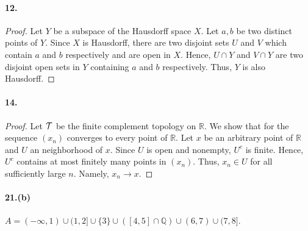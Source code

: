   \paragraph{12.}
  \begin{proof}
    Let $Y$ be a subspace of the Hausdorff space $X$. Let $a,b$ be two distinct
    points of $Y$. Since $X$ is Hausdorff, there are two disjoint sets $U$ and 
    $V$ which contain $a$ and $b$ respectively and are open in $X$. Hence, 
    $U\cap Y$ and $V\cap Y$ are two disjoint open sets in $Y$ containing $a$
    and $b$ respectively. Thus, $Y$ is also Hausdorff.
  \end{proof}
  
  \paragraph{14.}
  \begin{proof}
    Let $\mathcal{T}$ be the finite complement topology on $\mathbb{R}$. We show
    that for the sequence $(x_n)$ converges to every point of $\mathbb{R}$.
    Let $x$ be an arbitrary point of $\mathbb{R}$ and $U$ an neighborhood of 
    $x$. Since $U$ is open and nonempty, $U^c$ is finite. Hence, $U^c$ contains
    at most finitely many points in $(x_n)$. Thus, $x_n\in U$ for all 
    sufficiently large $n$. Namely, $x_n\to x$.
  \end{proof}
  
  \paragraph{21.(b)}
  \begin{solution}
    $A=(-\infty,1)\cup(1,2]\cup\{3\}\cup([4,5]\cap\mathbb{Q})\cup(6,7)\cup
    (7,8]$.
  \end{solution}






















